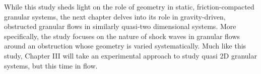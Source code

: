 While this study sheds light on the role of geometry in static, friction-compacted granular systems, the next chapter delves into its role in gravity-driven, obstructed granular flows in similarly quasi-two dimensional systems. More specifically, the study focuses on the nature of shock waves in granular flows around an obstruction whose geometry is varied systematically. Much like this study, Chapter III will take an experimental approach to study quasi 2D granular systems, but this time in flow.  